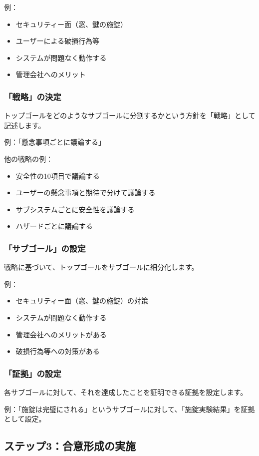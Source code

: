 例：
\begin{itemize}
    \item セキュリティー面（窓、鍵の施錠）
    \item ユーザーによる破損行為等
    \item システムが問題なく動作する
    \item 管理会社へのメリット
\end{itemize}

\subsubsection{「戦略」の決定}
トップゴールをどのようなサブゴールに分割するかという方針を「戦略」として記述します。

例：「懸念事項ごとに議論する」

他の戦略の例：
\begin{itemize}
    \item 安全性の10項目で議論する
    \item ユーザーの懸念事項と期待で分けて議論する
    \item サブシステムごとに安全性を議論する
    \item ハザードごとに議論する
\end{itemize}

\subsubsection{「サブゴール」の設定}
戦略に基づいて、トップゴールをサブゴールに細分化します。

例：
\begin{itemize}
    \item セキュリティー面（窓、鍵の施錠）の対策
    \item システムが問題なく動作する
    \item 管理会社へのメリットがある
    \item 破損行為等への対策がある
\end{itemize}

\subsubsection{「証拠」の設定}
各サブゴールに対して、それを達成したことを証明できる証拠を設定します。

例：「施錠は完璧にされる」というサブゴールに対して、「施錠実験結果」を証拠として設定。

\subsection{ステップ3：合意形成の実施}


